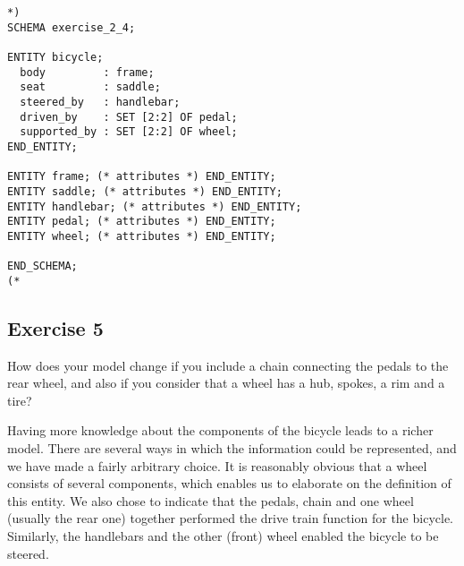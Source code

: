 \documentclass{article}
\newenvironment{code}{}{}
\begin{document}
\begin{code}
\begin{verbatim}
*)
SCHEMA exercise_2_4;

ENTITY bicycle;
  body         : frame;
  seat         : saddle;
  steered_by   : handlebar;
  driven_by    : SET [2:2] OF pedal;
  supported_by : SET [2:2] OF wheel;
END_ENTITY;

ENTITY frame; (* attributes *) END_ENTITY;
ENTITY saddle; (* attributes *) END_ENTITY;
ENTITY handlebar; (* attributes *) END_ENTITY;
ENTITY pedal; (* attributes *) END_ENTITY;
ENTITY wheel; (* attributes *) END_ENTITY;

END_SCHEMA;
(*
\end{verbatim}
\end{code}


\subsection{Exercise 5}

\begin{itshape}
How does your model change if you include a chain connecting the pedals
      to the rear wheel, and also if you consider that a wheel has a hub, 
      spokes, a rim and a tire?
\end{itshape}

    Having more knowledge about the components of the bicycle leads to 
a richer model. There are several ways in which the information could 
be represented, and we have made a fairly arbitrary choice. It is 
reasonably obvious that a wheel consists of several components, which 
enables us to elaborate on the definition of this entity. We also 
chose to indicate that the pedals, chain and one wheel (usually the 
rear one) together performed the drive train function for the
bicycle. Similarly, the handlebars and the other (front) wheel 
enabled the bicycle to be steered.
\end{document}
